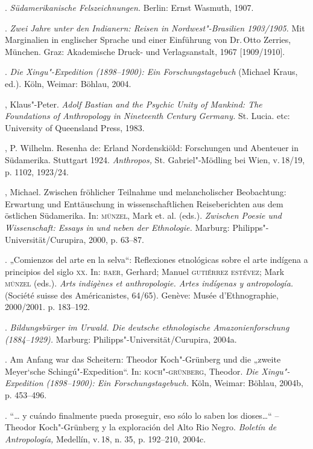 \begin{bibliohedra}
\titidem. \textit{Südamerikanische Felszeichnungen.} Berlin:
Ernst Wasmuth, 1907.

\titidem. \textit{Zwei Jahre unter den Indianern: Reisen in
Nordwest"-Brasilien 1903/1905.} Mit Marginalien in englischer Sprache
und einer Einführung von Dr.\,Otto Zerries, München. Graz: Akademische
Druck- und Verlagsanstalt, 1967 {[}1909/1910{]}.

\titidem. \textit{Die Xingu"-Expedition (1898--1900): Ein
Forschungstagebuch} (Michael Kraus, ed.). Köln, Weimar: Böhlau, 2004.

, Klaus"-Peter. \textit{Adolf Bastian and the Psychic Unity of
Mankind: The Foundations of Anthropology in Nineteenth Century Germany.}
St. Lucia. etc: University of Queensland Press, 1983.

, P. Wilhelm. Resenha de: Erland Nordenskiöld: Forschungen und
Abenteuer in Südamerika. Stuttgart 1924. \textit{Anthropos,} St.
Gabriel"-Mödling bei Wien, v.\,18/19, p. 1102, 1923/24.

, Michael. Zwischen fröhlicher Teilnahme und melancholischer
Beobachtung: Erwartung und Enttäuschung in wissenschaftlichen
Reiseberichten aus dem östlichen Südamerika. In: \textsc{münzel}, Mark et. al.
(eds.). \textit{Zwischen Poesie und Wissenschaft: Essays in und neben
der Ethnologie.} Marburg: Philipps"-Universität/Curupira, 2000, p.
63--87.

\titidem. „Comienzos del arte en la selva``: Reflexiones
etnológicas sobre el arte indígena a principios del siglo \textsc{xx}. In: \textsc{baer},
Gerhard; Manuel \textsc{gutiérrez estévez}; Mark \textsc{münzel} (eds.). \textit{Arts
indigènes et anthropologie. Artes indígenas y antropología.} (Société
suisse des Américanistes, 64/65). Genève: Musée d'Ethnographie,
2000/2001. p. 183--192.

\titidem. \textit{Bildungsbürger im Urwald. Die deutsche
ethnologische Amazonienforschung (1884--1929).} Marburg:
Philipps"-Universität/Curupira, 2004a.

\titidem. Am Anfang war das Scheitern: Theodor Koch"-Grünberg
und die „zweite Meyer`sche Schingú"-Expedition``. In: \textsc{koch"-grünberg},
Theodor. \textit{Die Xingu"-Expedition (1898--1900): Ein
Forschungstagebuch.} Köln, Weimar: Böhlau, 2004b, p. 453--496.

\titidem. ``\ldots{} y cuándo finalmente pueda proseguir, eso
sólo lo saben los dioses\ldots{}`` -- Theodor Koch"-Grünberg y la
exploración del Alto Rio Negro. \textit{Boletín de Antropología,}
Medellín, v.\,18, n. 35, p. 192--210, 2004c.


\end{bibliohedra}
